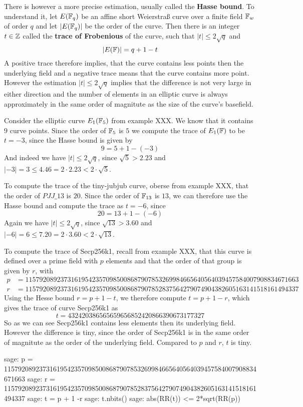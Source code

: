 There is however a more precise estimation, usually called the \textbf{Hasse bound}. To understand it, let $E(\mathbb{F}_q)$ be an affine short Weierstraß curve over a finite field $\mathbb{F}_w$ of order $q$ and let $|E(\mathbb{F}_q)|$ be the order of the curve. Then there is an integer $t\in \mathbb{Z}$ called the \textbf{trace of Frobenious} of the curve, such that $|t| \leq 2\sqrt{q}$ and
\begin{equation}
|E(\mathbb{F})| = q +1 -t
\end{equation}
A positive trace therefore implies, that the curve contains less points then the underlying field and a negative trace means that the curve contains more point. However the estimation $|t| \leq 2\sqrt{q}$ implies that the difference is not very large in either direction and the number of elements in an elliptic curve is always approximately in the same order of magnitute as the size of the curve's basefield.
\begin{example} Consider the elliptic curve $E_1(\mathbb{F}_5)$ from example XXX. We know that it contains $9$ curve points. Since the order of $\mathbb{F}_5$ is $5$ we compute the trace of $E_1(\mathbb{F})$ to be $t=-3$, since the Hasse bound is given by
$$
9 = 5 + 1 - (-3)
$$
And indeed we have $|t| \leq 2\sqrt{q}$, since $\sqrt{5}> 2.23$ and 
$|-3|= 3 \leq 4.46 = 2\cdot 2.23< 2\cdot \sqrt{5}$.
\end{example}
\begin{example} To compute the trace of the tiny-jubjub curve, oberse from example XXX, that the order of $\mathit{PJJ\_13}$ is $20$. Since the order of $\mathbb{F}_{13}$ is $13$, we can therefore use the Hasse bound and compute the trace as $t=-6$, since
$$
20 = 13 + 1 - (-6)
$$
Again we have $|t| \leq 2\sqrt{q}$, since $\sqrt{13}> 3.60$ and 
$|-6|= 6 \leq 7.20 = 2\cdot 3.60< 2\cdot \sqrt{13}$.
\end{example}
\begin{example}To compute the trace of Secp256k1, recall from example XXX, that this curve is defined over a prime field with $p$ elements and that the order of that group is given by $r$, with  
\begin{align*}
p &= \scriptstyle 115792089237316195423570985008687907853269984665640564039457584007908834671663\\
r &= \scriptstyle 115792089237316195423570985008687907852837564279074904382605163141518161494337
\end{align*}
Using the Hesse bound $r = p + 1 -t$, we therefore compute $t= p+1 -r$, which gives the trace of curve Secp256k1 as 
$$
t = \scriptstyle 432420386565659656852420866390673177327
$$
So as we can see Secp256k1 contains less elements then its underlying field. However  the difference is tiny, since the order of Secp256k1 is in the same order of magnitute as the order of the underlying field. Compared to $p$ and $r$, $t$ is tiny.
\begin{sagecommandline}
sage: p = 115792089237316195423570985008687907853269984665640564039457584007908834671663
sage: r = 115792089237316195423570985008687907852837564279074904382605163141518161494337
sage: t = p + 1 -r
sage: t.nbits()
sage: abs(RR(t)) <= 2*sqrt(RR(p))
\end{sagecommandline}
\end{example} 
